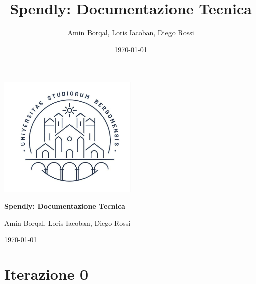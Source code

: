 \documentclass[12pt]{article}   %
\title{Spendly: Documentazione Tecnica}
\author{Amin Borqal, Loris Iacoban, Diego Rossi}
\date{\today}
\begin{document}
\begin{titlepage}
  \centering
  \vspace*{2cm} %

  \includegraphics[width=0.5\textwidth]{images/Marchio.jpg}\par
  \vspace{1cm}
  
  {\Huge \bfseries Spendly: Documentazione Tecnica\par}
  \vspace{1cm}
  
  {\Large Amin Borqal, Loris Iacoban, Diego Rossi\par}
  \vspace{1cm}
  
  {\Large \today\par}
  \vfill
\end{titlepage}

\tableofcontents
{} %
\newpage
\listoffigures
\listoftables
\newpage 

\section{Iterazione 0}



\newpage

\newpage



%
\newpage

\end{document}

